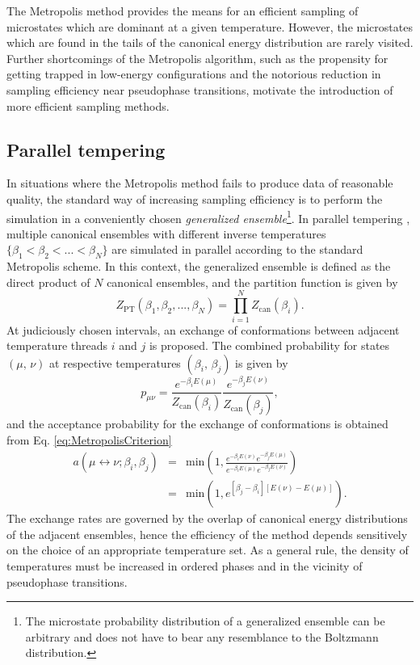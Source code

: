 \documentclass[12pt]{report}
\begin{document}
The Metropolis method provides the means for an efficient sampling of microstates which are dominant at a given temperature. However, the microstates which are found in the tails of the canonical energy distribution are rarely visited. Further shortcomings of the Metropolis algorithm, such as the propensity for getting trapped in low-energy configurations and the notorious reduction in sampling efficiency near pseudophase transitions, motivate the introduction of more efficient sampling methods.


\subsection{Parallel tempering}
In situations where the Metropolis method fails to produce data of reasonable quality, the standard way of increasing sampling efficiency is to perform the simulation in a conveniently chosen \textit{generalized ensemble}\footnote{The microstate probability distribution of a generalized ensemble can be arbitrary and does not have to bear any resemblance to the Boltzmann distribution.}. In parallel tempering \cite{sw1,geyer1,huku1,huku2}, multiple canonical ensembles with different inverse temperatures $\{\beta_{1} < \beta_{2} < ... < \beta_{N}\}$ are simulated in parallel according to the standard Metropolis scheme. In this context, the generalized ensemble is defined as the direct product of $N$ canonical ensembles, and the partition function is given by
%
\begin{equation}
Z_{\mathrm{PT}}(\beta_{1},\beta_{2},...,\beta_{N}) = \prod_{i=1}^{N} Z_{\mathrm{can}}(\beta_{i}).
\end{equation}
%
At judiciously chosen intervals, an exchange of conformations between adjacent temperature threads $i$ and $j$ is proposed. The combined probability for states $(\mu, \, \nu)$ at respective temperatures $(\beta_{i}, \, \beta_{j})$ is given by
\begin{equation}
p_{\mu\nu} =  \frac{\displaystyle e^{-\beta_{i}E(\mu)}}{\displaystyle Z_{\mathrm{can}}(\beta_{i})} \frac{\displaystyle e^{-\beta_{j}E(\nu)}}{\displaystyle Z_{\mathrm{can}}(\beta_{j})},
\end{equation}
%
and the acceptance probability for the exchange of conformations is obtained from Eq. \ref{eq:MetropolisCriterion}
%
\begin{eqnarray}
\label{eq:replicaExchange}
a\left(\mu \leftrightarrow \nu;\beta _{i}, \beta_{j} \right) &=&
\mathrm{min}\left(1, \frac{\displaystyle e^{-\beta_{i}E(\nu)}e^{-\beta_{j}E(\mu)}}{\displaystyle e^{-\beta_{i}E(\mu)}e^{-\beta_{j}E(\nu)}}\right) \nonumber \\
&=&
\mathrm{min}\left(1,e^{\left[\beta_{j} -
\beta _{i} \right] \left[E (\nu) -
E(\mu)\right]} \right).
\end{eqnarray}
%
The exchange rates are governed by the overlap of canonical energy distributions of the adjacent ensembles, hence the efficiency of the method depends sensitively on the choice of an appropriate temperature set. As a general rule, the density of temperatures must be increased in ordered phases and in the vicinity of pseudophase transitions. 
\end{document}
